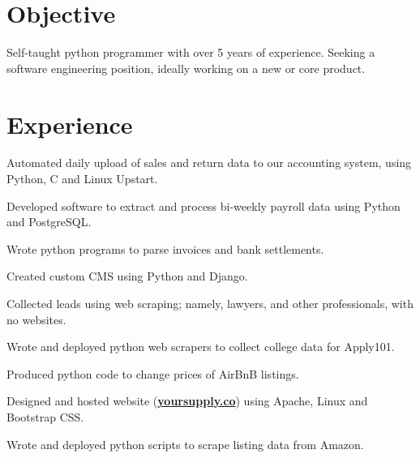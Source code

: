 \documentclass[]{deemweaver}
\begin{document}
\begin{minipage}[t]{0.66\textwidth} 

\section{Objective}
Self-taught python programmer with over 5 years of experience. Seeking a software engineering position, ideally working on a new or core product.

\section{Experience}
\begin{tightemize}
\vspace{\topsep} %
\item Automated daily upload of sales and return data to our accounting system, using Python, C and Linux Upstart.
\item Developed software to extract and process bi-weekly payroll data using Python and PostgreSQL. 
\item Wrote python programs to parse invoices and bank settlements.
\end{tightemize}
\sectionsep

\begin{tightemize}
\item Created custom CMS using Python and Django.
\item Collected leads using web scraping; namely, lawyers, and other professionals, with no websites.
\item Wrote and deployed python web scrapers to collect college data for Apply101.
\item Produced python code to change prices of AirBnB listings.
\end{tightemize}
\sectionsep

\begin{tightemize}
\item Designed and hosted website (\href{http://yoursupply.co}{\bf yoursupply.co}) using Apache, Linux and Bootstrap CSS.
\item Wrote and deployed python scripts to scrape listing data from Amazon.
\end{tightemize}
\sectionsep



\end{minipage}
\end{document}
